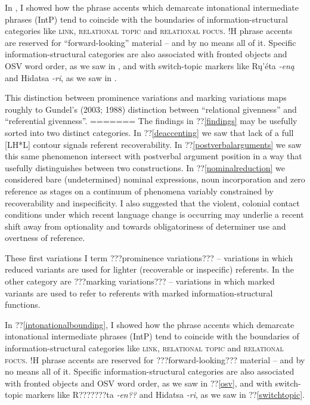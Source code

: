 \documentclass[output=paper]{LSP/langsci}
\begin{document}
In , I showed how the phrase accents which demarcate intonational intermediate phrases (IntP) tend to coincide with the boundaries of information-structural categories like \textsc{link, relational topic} and \textsc{relational focus}. !H phrase accents are reserved for “forward-looking” material -- and by no means all of it. Specific information-structural categories are also associated with fronted objects and OSV word order, as we saw in , and with switch-topic markers like Rų’éta \emph{-eną} and Hidatsa \emph{-ri}, as we saw in .

This distinction between prominence variations and marking variations maps roughly to Gundel’s (2003; 1988) distinction between “relational givenness” and  “referential givenness”.
=======
The findings in ??\ref{findings} may be usefully sorted into two distinct categories. In ??\ref{deaccenting} we saw that lack of a full [LH*L] contour signals referent recoverability. In ??\ref{postverbalarguments} we saw this same phenomenon intersect with postverbal argument position in a way that usefully distinguishes between two constructions. In ??\ref{nominalreduction} we considered bare (undetermined) nominal expressions, noun incorporation and zero reference as stages on a continuum of phenomena variably constrained by recoverability and inspecificity. I also suggested that the violent, colonial contact conditions under which recent language change is occurring may underlie a recent shift away from optionality and towards obligatoriness of determiner use and overtness of reference. 

These first variations I term ???prominence variations??? -- variations in which reduced variants are used for lighter (recoverable or inspecific) referents. In the other category are ???marking variations??? -- variations in which marked variants are used to refer to referents with marked information-structural functions. 

In ??\ref{intonationalbounding}, I showed how the phrase accents which demarcate intonational intermediate phrases (IntP) tend to coincide with the boundaries of information-structural categories like \textsc{link, relational topic} and \textsc{relational focus}. !H phrase accents are reserved for ???forward-looking??? material -- and by no means all of it. Specific information-structural categories are also associated with fronted objects and OSV word order, as we saw in ??\ref{osv}, and with switch-topic markers like R???????ta \emph{-en??} and Hidatsa \emph{-ri}, as we saw in ??\ref{switchtopic}.
\end{document}
